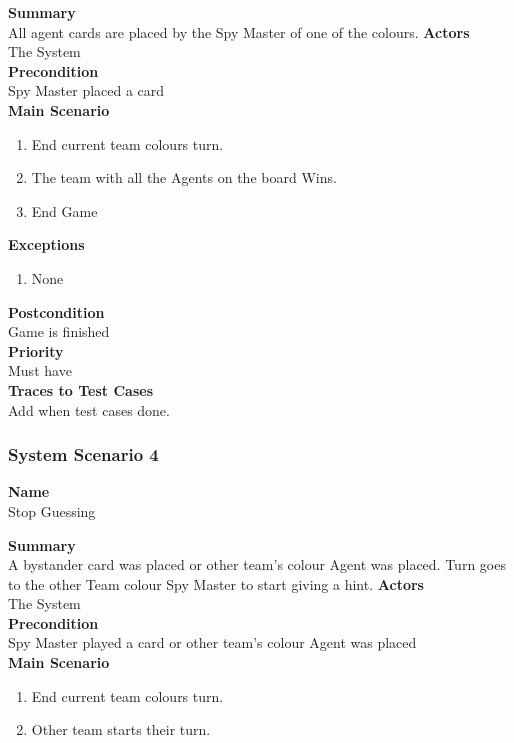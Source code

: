 \documentclass[12pt]{article}
\begin{document}
\noindent
{\bf Summary}\\
All agent cards are placed by the Spy Master of one of the colours.
\noindent
{\bf Actors}\\
The System\\
\noindent
{\bf Precondition}\\
Spy Master placed a card\\
\noindent
{\bf Main Scenario}\\
\vspace*{-0.2in}
\begin{enumerate}
\item End current team colours turn.
\item The team with all the Agents on the board Wins.
\item End Game
\end{enumerate}

\noindent
{\bf Exceptions}
\begin{enumerate}
\item None
\end{enumerate}
\noindent
{\bf Postcondition}\\
Game is finished\\
\noindent
{\bf Priority}\\
Must have\\
\noindent
{\bf Traces to Test Cases}\\
Add when test cases done.
\newpage
\subsubsection{System Scenario 4} \label{ss:4}

\noindent
{\bf Name}\\
Stop Guessing

\noindent
{\bf Summary}\\
A bystander card was placed or other team's colour Agent was placed. Turn goes to the other Team colour Spy Master to start giving a hint.
\noindent
{\bf Actors}\\
The System\\
\noindent
{\bf Precondition}\\
Spy Master played a card or other team's colour Agent was placed\\
\noindent
{\bf Main Scenario}\\
\vspace*{-0.2in}
\begin{enumerate}
\item End current team colours turn.
\item Other team starts their turn.
\end{enumerate}
\end{document}
